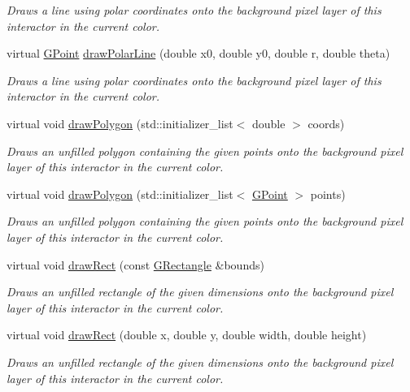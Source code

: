 \begin{DoxyCompactItemize}
\begin{DoxyCompactList}\small\item\em Draws a line using polar coordinates onto the background pixel layer of this interactor in the current color. \end{DoxyCompactList}\item 
virtual \mbox{\hyperlink{structGPoint}{G\+Point}} \mbox{\hyperlink{classGDrawingSurface_ad3e646f90005295f2bbdf37d2bcb39d2}{draw\+Polar\+Line}} (double x0, double y0, double r, double theta)
\begin{DoxyCompactList}\small\item\em Draws a line using polar coordinates onto the background pixel layer of this interactor in the current color. \end{DoxyCompactList}\item 
virtual void \mbox{\hyperlink{classGDrawingSurface_afddec0a905108d8a8d6809a157f26776}{draw\+Polygon}} (std\+::initializer\+\_\+list$<$ double $>$ coords)
\begin{DoxyCompactList}\small\item\em Draws an unfilled polygon containing the given points onto the background pixel layer of this interactor in the current color. \end{DoxyCompactList}\item 
virtual void \mbox{\hyperlink{classGDrawingSurface_a021ee881e0d154dc4dd059698742889c}{draw\+Polygon}} (std\+::initializer\+\_\+list$<$ \mbox{\hyperlink{structGPoint}{G\+Point}} $>$ points)
\begin{DoxyCompactList}\small\item\em Draws an unfilled polygon containing the given points onto the background pixel layer of this interactor in the current color. \end{DoxyCompactList}\item 
virtual void \mbox{\hyperlink{classGDrawingSurface_a3dd4cc5891149dfc36746264f7289877}{draw\+Rect}} (const \mbox{\hyperlink{structGRectangle}{G\+Rectangle}} \&bounds)
\begin{DoxyCompactList}\small\item\em Draws an unfilled rectangle of the given dimensions onto the background pixel layer of this interactor in the current color. \end{DoxyCompactList}\item 
virtual void \mbox{\hyperlink{classGDrawingSurface_a4148e770ffc5474153aadd4814dbd708}{draw\+Rect}} (double x, double y, double width, double height)
\begin{DoxyCompactList}\small\item\em Draws an unfilled rectangle of the given dimensions onto the background pixel layer of this interactor in the current color. \end{DoxyCompactList}\item 

\end{DoxyCompactItemize}
